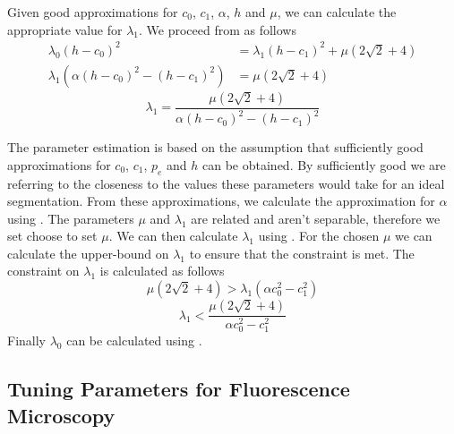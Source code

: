 \begin{definition} Given good approximations for $c_0$, $c_1$, $\alpha$, $h$ and $\mu$, we can calculate the appropriate value for $\lambda_1$. We proceed from  as follows
\begin{equation*}\begin{split}
	\lambda_0(h-c_0)^2 &= \lambda_1(h-c_1)^2 + \mu(2\sqrt{2}+4)\\
	\lambda_1 \left( \alpha(h-c_0)^2-(h-c_1)^2 \right) &= \mu(2\sqrt{2}+4)
\end{split}\end{equation*}
\begin{equation}
	\lambda_1 = \frac{\mu(2\sqrt{2}+4)}{\alpha(h-c_0)^2-(h-c_1)^2}
	\label{eq:lambda1approximation}
\end{equation}
\end{definition}

\begin{definition}
	The parameter estimation is based on the assumption that sufficiently good approximations for $c_0$, $c_1$, $p_e$ and $h$ can be obtained. By sufficiently good we are referring to the closeness to the values these parameters would take for an ideal segmentation. From these approximations, we calculate the approximation for $\alpha$ using . The parameters $\mu$ and $\lambda_1$ are related and aren't separable, therefore we set choose to set $\mu$. We can then calculate $\lambda_1$ using . For the chosen $\mu$ we can calculate the upper-bound on $\lambda_1$ to ensure that the constraint  is met. The constraint on $\lambda_1$ is calculated as follows
\begin{equation*}
\mu\left( 2\sqrt{2} + 4 \right) > \lambda_1(\alpha c_0^2 - c_1^2)
\end{equation*}
\begin{equation}
	\lambda_1 < \frac{\mu\left( 2\sqrt{2} + 4 \right)}{\alpha c_0^2 - c_1^2}
\end{equation}
Finally $\lambda_0$ can be calculated using .
\end{definition}

\subsection{Tuning Parameters for Fluorescence Microscopy}
\label{sec:cvgc_parameterestimation}

